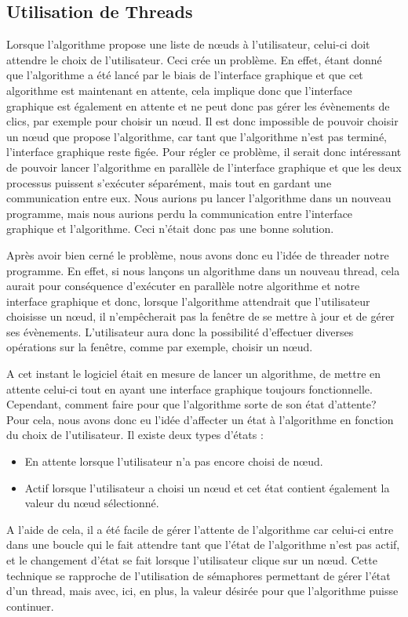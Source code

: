 \documentclass[11pt,a4paper]{article}
\begin{document}
		\subsection{Utilisation de Threads}
			Lorsque l'algorithme propose une liste de n\oe uds à l'utilisateur, celui-ci doit attendre le choix de l'utilisateur. Ceci crée un problème. En effet, étant donné que l'algorithme a été lancé par le biais de l'interface graphique et que cet algorithme est maintenant en attente, cela implique donc que l'interface graphique est également en attente et ne peut donc pas gérer les évènements de clics, par exemple pour choisir un n\oe ud. Il est donc impossible de pouvoir choisir un n\oe ud que propose l'algorithme, car tant que l'algorithme n'est pas terminé, l'interface graphique reste figée. Pour régler ce problème, il serait donc intéressant de pouvoir lancer l'algorithme en parallèle de l'interface graphique et que les deux processus puissent s'exécuter séparément, mais tout en gardant une communication entre eux. Nous aurions pu lancer l'algorithme dans un nouveau programme, mais nous aurions perdu la communication entre l'interface graphique et l'algorithme. Ceci n'était donc pas une bonne solution.
			
			Après avoir bien cerné le problème, nous avons donc eu l'idée de threader notre programme. En effet, si nous lançons un algorithme dans un nouveau thread, cela aurait pour conséquence d'exécuter en parallèle notre algorithme et notre interface graphique et donc, lorsque l'algorithme attendrait que l'utilisateur choisisse un n\oe ud, il n'empêcherait pas la fenêtre de se mettre à jour et de gérer ses évènements. L'utilisateur aura donc la possibilité d'effectuer diverses opérations sur la fenêtre, comme par exemple, choisir un n\oe ud. 

	A cet instant le logiciel était en mesure de lancer un algorithme, de mettre en attente celui-ci tout en ayant une interface graphique toujours fonctionnelle. Cependant, comment faire pour que l'algorithme sorte de son état d'attente? Pour cela, nous avons donc eu l'idée d'affecter un état à l'algorithme en fonction du choix de l'utilisateur. Il existe deux types d'états :
		\begin{itemize}
			\item En attente lorsque l'utilisateur n'a pas encore choisi de n\oe ud.
			\item Actif lorsque l'utilisateur a choisi un n\oe ud et cet état contient également la valeur du n\oe ud sélectionné.
		\end{itemize}
		A l'aide de cela, il a été facile de gérer l'attente de l'algorithme car celui-ci entre dans une boucle qui le fait attendre tant que l'état de l'algorithme n'est pas actif, et le changement d'état se fait lorsque l'utilisateur clique sur un n\oe ud. Cette technique se rapproche de l'utilisation de sémaphores permettant de gérer l'état d'un thread, mais avec, ici, en plus, la valeur désirée pour que l'algorithme puisse continuer.
		
\end{document}
